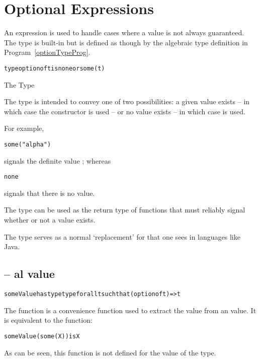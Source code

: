 \section{Optional Expressions}
\label{optionExpression}

An  expression is used to handle cases where a value is not always guaranteed. The  type is built-in but is defined as though by the algebraic type definition in Program~\vref{optionTypeProg}.

\begin{program}
\begin{alltt}
type option of t is none or some(t)
\end{alltt}
\caption{The  Type}
\label{optionTypeProg}
\end{program}

The  type is intended to convey one of two possibilities: a given value exists -- in which case the  constructor is used -- or no value exists -- in which case  is used.

For example,
\begin{alltt}
some("alpha")
\end{alltt}
signals the definite  value ; whereas 
\begin{alltt}
none
\end{alltt}
signals that there is no value.

The  type can be used as the return type of functions that must reliably signal whether or not a value exists.
\begin{aside}
The  type serves as a normal `replacement' for  that one sees in languages like Java.
\end{aside}

\subsection{ -- al value}
\label{someValue}

\begin{alltt}
someValue has type type for all t such that (option of t)=>t
\end{alltt}
The  function is a convenience function used to extract the value from an  value. It is equivalent to the function:
\begin{alltt}
someValue(some(X)) is X
\end{alltt}
As can be seen, this function is not defined for the  value of the  type.

